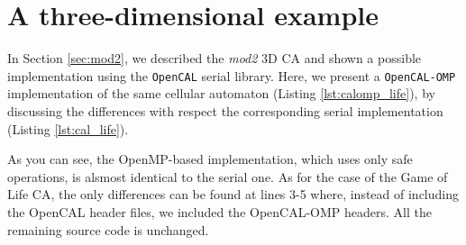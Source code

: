 


\section{A three-dimensional example}
In Section \ref{sec:mod2}, we described the \emph{mod2} 3D CA and
shown a possible implementation using the \verb'OpenCAL' serial
library. Here, we present a \verb'OpenCAL-OMP' implementation of the
same cellular automaton (Listing \ref{lst:calomp_life}), by discussing
the differences with respect the corresponding serial implementation
(Listing \ref{lst:cal_life}).



As you can see, the OpenMP-based implementation, which uses
only safe operations, is alsmost identical to the serial one. As for the case of the  Game of Life CA, the only
differences can be found at lines 3-5 where, instead of including the
OpenCAL header files, we included the OpenCAL-OMP headers. All the
remaining source code is unchanged.
